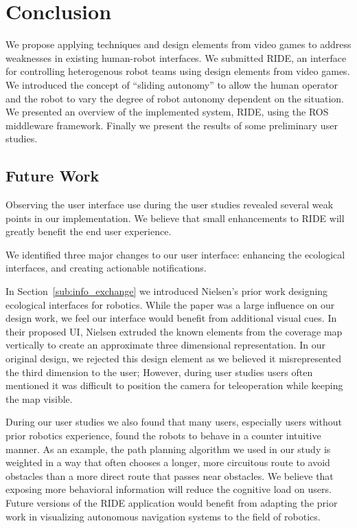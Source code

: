 \chapter{Conclusion}

We propose applying techniques and design elements from video games to address weaknesses in existing human-robot interfaces. We submitted RIDE, an interface for controlling heterogenous robot teams using design elements from video games. We introduced the concept of ``sliding autonomy'' to allow the human operator and the robot to vary the degree of robot autonomy dependent on the situation. We presented an overview of the implemented system, RIDE, using the ROS middleware framework. Finally we present the results of some preliminary user studies.

\section{Future Work}
\label{section:futurework}
Observing the user interface use during the user studies revealed several weak points in our implementation. We believe that small enhancements to RIDE will greatly benefit the end user experience. 

We identified three major changes to our user interface: enhancing the ecological interfaces,  and creating actionable notifications.

In Section~\ref{sub:info_exchange} we introduced Nielsen's prior work designing ecological interfaces for robotics. While the paper was a large influence on our design work, we feel our interface would benefit from additional visual cues. In their proposed UI, Nielsen extruded the known elements from the coverage map vertically to create an approximate three dimensional representation. \cite{Nielsen_Teleoperation} In our original design, we rejected this design element as we believed it misrepresented the third dimension to the user; However, during user studies users often mentioned it was difficult to position the camera for teleoperation while keeping the map visible.

During our user studies we also found that many users, especially users without prior robotics experience, found the robots to behave in a counter intuitive manner. As an example, the path planning algorithm we used in our study is weighted in a way that often chooses a longer, more circuitous route to avoid obstacles than a more direct route that passes near obstacles. We believe that exposing more behavioral information will reduce the cognitive load on users. Future versions of the RIDE application would benefit from adapting the prior work in visualizing autonomous navigation systems to the field of robotics.

